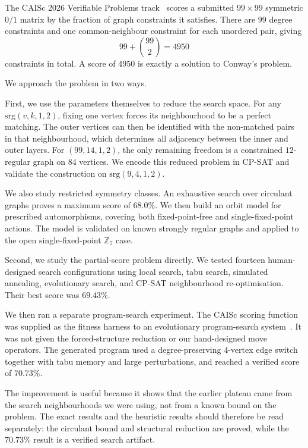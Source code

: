 \documentclass{article}
\begin{document}
The CAISc 2026 Verifiable Problems track~\cite{caiscproblem} scores a submitted
$99\times99$ symmetric $0/1$ matrix by the fraction of graph constraints it
satisfies. There are $99$ degree constraints and one common-neighbour
constraint for each unordered pair, giving
\[
99+\binom{99}{2}=4950
\]
constraints in total. A score of $4950$ is exactly a solution to Conway's
problem.

We approach the problem in two ways.

First, we use the parameters themselves to reduce the search space. For any
$\mathrm{srg}(v,k,1,2)$, fixing one vertex forces its neighbourhood to be a
perfect matching. The outer vertices can then be identified with the
non-matched pairs in that neighbourhood, which determines all adjacency
between the inner and outer layers. For $(99,14,1,2)$, the only remaining
freedom is a constrained $12$-regular graph on $84$ vertices. We encode this
reduced problem in CP-SAT and validate the construction on
$\mathrm{srg}(9,4,1,2)$.

We also study restricted symmetry classes. An exhaustive search over circulant
graphs proves a maximum score of $68.0\%$. We then build an orbit model for
prescribed automorphisms, covering both fixed-point-free and
single-fixed-point actions. The model is validated on known strongly regular
graphs and applied to the open single-fixed-point $\mathbb{Z}_7$ case.

Second, we study the partial-score problem directly. We tested fourteen
human-designed search configurations using local search, tabu search,
simulated annealing, evolutionary search, and CP-SAT neighbourhood
re-optimisation. Their best score was $69.43\%$.

We then ran a separate program-search experiment. The CAISc scoring function
was supplied as the fitness harness to an evolutionary program-search
system~\cite{alphaevolve}. It was not given the forced-structure reduction or
our hand-designed move operators. The generated program used a
degree-preserving $4$-vertex edge switch together with tabu memory and large
perturbations, and reached a verified score of $70.73\%$.

The improvement is useful because it shows that the earlier plateau came from
the search neighbourhoods we were using, not from a known bound on the
problem. The exact results and the heuristic results should therefore be read
separately: the circulant bound and structural reduction are proved, while the
$70.73\%$ result is a verified search artifact.
\end{document}

